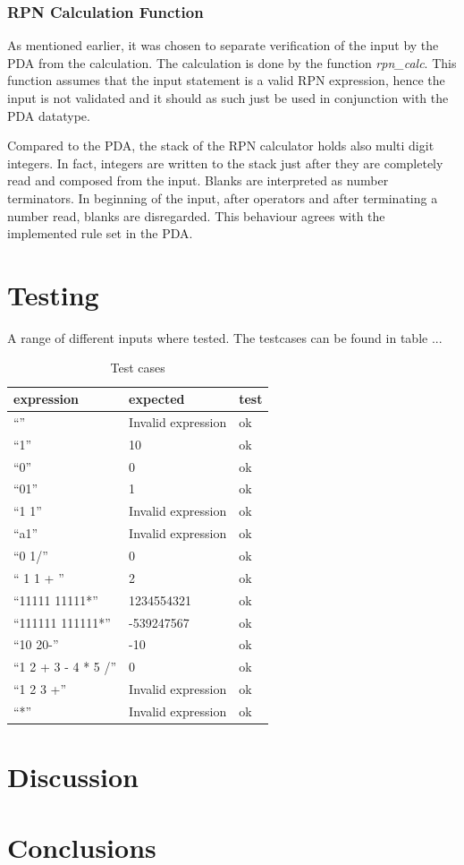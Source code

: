 \documentclass[a4paper,11pt,twoside]{article}
\begin{document}
\subsubsection{RPN Calculation Function}
As mentioned earlier, it was chosen to separate verification of the
input by the PDA from the calculation. The calculation is done by the
function \textit{rpn\_calc}. This function assumes that the input
statement is a valid RPN expression, hence the input is not
validated and it should as such just be used in conjunction with the
PDA datatype.

Compared to the PDA, the stack of the RPN calculator holds also multi
digit integers. In fact, integers are written to the stack just after
they are completely read and composed from the input. Blanks are
interpreted as number terminators. In beginning of the input, after
operators and after terminating a number read, blanks are
disregarded. This behaviour agrees with the implemented rule set in
the PDA. 

\section{Testing}
A range of different inputs where tested. The testcases can be found
in table ...

\begin{table}[]
\centering
\caption{Test cases}
\label{tab:test}
\begin{tabular}{lll}
expression          & expected           & test \\ \hline
``''                  & Invalid expression & ok   \\
``1''                 & 10                 & ok   \\
``0''                 & 0                  & ok   \\
``01''                & 1                  & ok   \\
``1 1''               & Invalid expression & ok   \\
``a1''                & Invalid expression & ok   \\
``0 1/''              & 0                  & ok   \\
``   1 1  +  ''       & 2                  & ok   \\
``11111 11111*''      & 1234554321         & ok   \\
``111111 111111*''    & -539247567         & ok   \\
``10 20-''            & -10                & ok   \\
``1 2 + 3 - 4 * 5 /'' & 0                  & ok   \\
``1 2 3 +''           & Invalid expression & ok   \\
``*''                 & Invalid expression & ok  
\end{tabular}
\end{table}



\section{Discussion}

\section{Conclusions}


\end{document}
